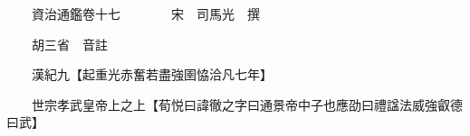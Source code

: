 










 


 
 


 

  
  
  
  
  





  
  
  
  
  
 
  

  

  
  
  



  

 
 

  
   




  

  
  


  　　資治通鑑卷十七　　　　宋　司馬光　撰

　　胡三省　音註

　　漢紀九【起重光赤奮若盡強圉恊洽凡七年】

　　世宗孝武皇帝上之上【荀悦曰諱徹之字曰通景帝中子也應劭曰禮諡法威強叡德曰武】

